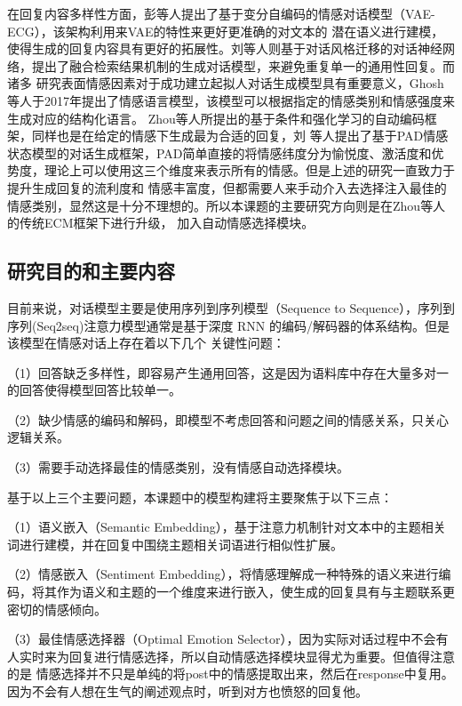 \documentclass[supercite]{HustGraduPaper}
\theoremstyle{definition}
\begin{document}
在回复内容多样性方面，彭\cite{彭叶红2019基于主题模型与变分自编码的情感对话生成技术研究}等人提出了基于变分自编码的情感对话模型（VAE-ECG），该架构利用来VAE的特性来更好更准确的对文本的
潜在语义进行建模，使得生成的回复内容具有更好的拓展性。刘\cite{对话风格迁移}等人则基于对话风格迁移的对话神经网络，提出了融合检索结果机制的生成对话模型，来避免重复单一的通用性回复。而诸多
研究表面情感因素对于成功建立起拟人对话生成模型具有重要意义，Ghosh\cite{ghosh2017affect}等人于2017年提出了情感语言模型，该模型可以根据指定的情感类别和情感强度来生成对应的结构化语言。
Zhou等人\cite{DBLP:journals/corr/ZhouHZZL17}所提出的基于条件和强化学习的自动编码框架，同样也是在给定的情感下生成最为合适的回复，刘\cite{刘宁2019人机交互的情感拟人化策略研究}
等人提出了基于PAD情感状态模型的对话生成框架，PAD简单直接的将情感纬度分为愉悦度、激活度和优势度，理论上可以使用这三个维度来表示所有的情感。但是上述的研究一直致力于提升生成回复的流利度和
情感丰富度，但都需要人来手动介入去选择注入最佳的情感类别，显然这是十分不理想的。所以本课题的主要研究方向则是在Zhou\cite{DBLP:journals/corr/ZhouHZZL17}等人的传统ECM框架下进行升级，
加入自动情感选择模块。

\subsection{研究目的和主要内容}
目前来说，对话模型主要是使用序列到序列模型（Sequence to Sequence），序列到序列(Seq2seq)注意力模型通常是基于深度 RNN 的编码/解码器的体系结构。但是该模型在情感对话上存在着以下几个
关键性问题：

（1）回答缺乏多样性，即容易产生通用回答，这是因为语料库中存在大量多对一的回答使得模型回答比较单一。

（2）缺少情感的编码和解码，即模型不考虑回答和问题之间的情感关系，只关心逻辑关系。

（3）需要手动选择最佳的情感类别，没有情感自动选择模块。

基于以上三个主要问题，本课题中的模型构建将主要聚焦于以下三点：

（1）语义嵌入（Semantic Embedding），基于注意力机制针对文本中的主题相关词进行建模，并在回复中围绕主题相关词语进行相似性扩展。

（2）情感嵌入（Sentiment Embedding），将情感理解成一种特殊的语义来进行编码，将其作为语义和主题的一个维度来进行嵌入，使生成的回复具有与主题联系更密切的情感倾向。

（3）最佳情感选择器\cite{wei2019emotion}（Optimal Emotion Selector），因为实际对话过程中不会有人实时来为回复进行情感选择，所以自动情感选择模块显得尤为重要。但值得注意的是
情感选择并不只是单纯的将post中的情感提取出来，然后在response中复用。因为不会有人想在生气的阐述观点时，听到对方也愤怒的回复他。
\end{document}
